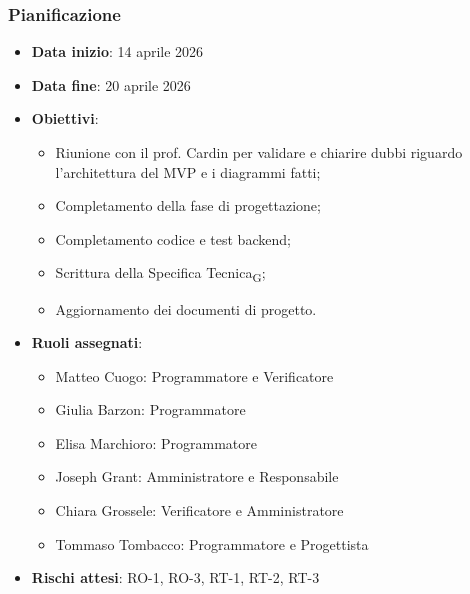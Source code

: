 \documentclass[11pt,a4paper]{article}
\newcommand{\gls}[1]{#1\textsubscript{G}}
\begin{document}
\subsubsection{Pianificazione}
\begin{itemize}
    \item \textbf{Data inizio}: 14 aprile 2026
    \item \textbf{Data fine}: 20 aprile 2026
        \item \textbf{Obiettivi}:
    \begin{itemize}
        \item Riunione con il prof. Cardin per validare e chiarire dubbi riguardo l'architettura del MVP e i diagrammi fatti;
        \item Completamento della fase di progettazione;
        \item Completamento codice e test backend;
        \item Scrittura della \gls{Specifica Tecnica};
        \item Aggiornamento dei documenti di progetto.
    \end{itemize}
    
    \item \textbf{Ruoli assegnati}:
    \begin{itemize}
        \item Matteo Cuogo: Programmatore e Verificatore
        \item Giulia Barzon: Programmatore 
        \item Elisa Marchioro: Programmatore
        \item Joseph Grant: Amministratore e Responsabile
        \item Chiara Grossele: Verificatore e Amministratore
        \item Tommaso Tombacco: Programmatore e Progettista
    \end{itemize}
    \item \textbf{Rischi attesi}: RO-1, RO-3, RT-1, RT-2, RT-3
\end{itemize}
\end{document}
